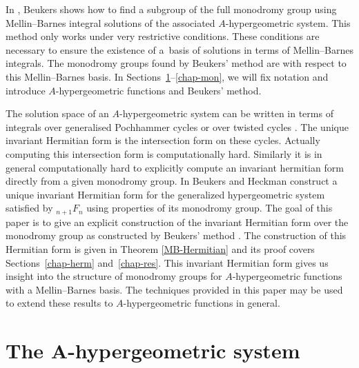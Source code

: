\documentclass[11pt]{article}
\numberwithin{equation}{section}
\numberwithin{equation}{section}
\begin{document}
In \cite{Beu13}, Beukers shows how to find a subgroup of the full monodromy group using Mellin--Barnes integral solutions of the associated $A$-hypergeometric system. This method only works under very restrictive conditions. These conditions are necessary to ensure the existence of a~basis of solutions in terms of Mellin--Barnes integrals. The monodromy groups found by Beukers' method are with respect to this Mellin--Barnes basis. In Sections~\ref{chap-ahyp}--\ref{chap-mon}, we will fix notation and introduce $A$-hypergeometric functions and Beukers' method.

The solution space of an $A$-hypergeometric system can be written in terms of integrals over generalised Pochhammer cycles \cite{Beu08} or over twisted cycles \cite{Kit94}. The unique invariant Hermitian form is the intersection form on these cycles. Actually computing this intersection form is computationally hard. Similarly it is in general computationally hard to explicitly compute an invariant hermitian form directly from a given monodromy group. In \cite{Beu89} Beukers and Heckman construct a unique invariant Hermitian form for the generalized hypergeometric system satisfied by ${}_{n+1}F_{n}$ using properties of its monodromy group. The goal of this paper is to give an explicit construction of the invariant Hermitian form over the monodromy group as constructed by Beukers' method \cite{Beu13}. The construction of this Hermitian form is given in Theorem \ref{MB-Hermitian} and its proof covers Sections~\ref{chap-herm} and~\ref{chap-res}. This invariant Hermitian form gives us insight into the structure of monodromy groups for $A$-hypergeometric functions with a Mellin--Barnes basis. The techniques provided in this paper may be used to extend these results to $A$-hypergeometric functions in general.

\setcounter{section}{1}
\section[The A-hypergeometric system]{The ${\boldsymbol A}$-hypergeometric system}\label{chap-ahyp}
\end{document}
